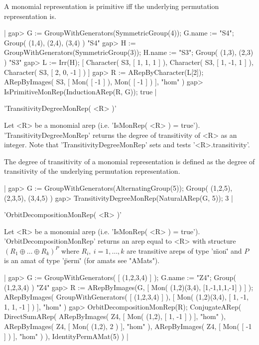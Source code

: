 A monomial representation is primitive iff the underlying 
permutation representation is.

|    gap> G := GroupWithGenerators(SymmetricGroup(4)); G.name := "S4";
    Group( (1,4), (2,4), (3,4) )
    "S4"
    gap> H := GroupWithGenerators(SymmetricGroup(3)); H.name := "S3";
    Group( (1,3), (2,3) )
    "S3"
    gap> L := Irr(H);
    [ Character( S3, [ 1, 1, 1 ] ), Character( S3, [ 1, -1, 1 ] ), 
      Character( S3, [ 2, 0, -1 ] ) ]
    gap> R := ARepByCharacter(L[2]);
    ARepByImages(
      S3,
      [ Mon( [ -1 ] ),
        Mon( [ -1 ] )
      ],
      "hom"
    )
    gap> IsPrimitiveMonRep(InductionARep(R, G));
    true |


'TransitivityDegreeMonRep( <R> )'

Let <R> be a monomial arep (i.e. 'IsMonRep( <R> ) = true').
'TransitivityDegreeMonRep' returns the degree of transitivity
of <R> as an integer.
Note that 'TransitivityDegreeMonRep' sets and tests '<R>.transitivity'.

The degree of transitivity of a monomial representation is defined 
as the degree of transitivity of the underlying permutation 
representation.

|    gap> G := GroupWithGenerators(AlternatingGroup(5));
    Group( (1,2,5), (2,3,5), (3,4,5) )
    gap> TransitivityDegreeMonRep(NaturalARep(G, 5));
    3 |


'OrbitDecompositionMonRep( <R> )'

Let <R> be a monomial arep (i.e. 'IsMonRep( <R> ) = true').
'OrbitDecompositionMonRep' returns an arep equal to <R> with 
structure $(R_1\oplus\dots\oplus R_k)^P$ 
where $R_i,\ i = 1,\dots,k$ are transitive areps of type '\"mon\"' and 
$P$ is an amat of type '\"perm\"' (for amats see "AMats").

|    gap> G := GroupWithGenerators( [ (1,2,3,4) ] ); G.name := "Z4";
    Group( (1,2,3,4) )
    "Z4"
    gap> R := ARepByImages(G, [ Mon( (1,2)(3,4), [1,-1,1,1,-1] ) ] );
    ARepByImages(
      GroupWithGenerators( [ (1,2,3,4) ] ),
      [ Mon( (1,2)(3,4), [ 1, -1, 1, 1, -1 ] ) ],
      "hom"
    )
    gap> OrbitDecompositionMonRep(R);
    ConjugateARep(
      DirectSumARep(
        ARepByImages(
          Z4,
          [ Mon( (1,2), [ 1, -1 ] ) ],
          "hom"
        ),
        ARepByImages(
          Z4,
          [ Mon( (1,2), 2 ) ],
          "hom"
        ),
        ARepByImages(
          Z4,
          [ Mon( [ -1 ] ) ],
          "hom"
        )
      ),
      IdentityPermAMat(5)
    ) |

